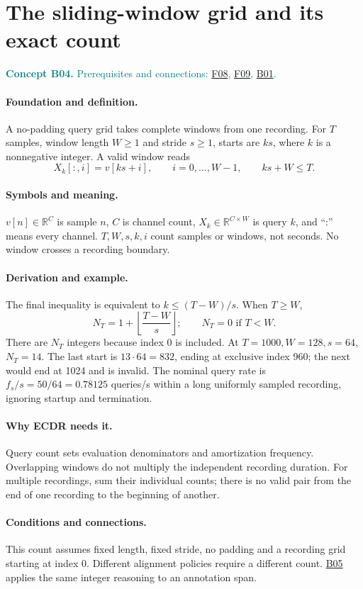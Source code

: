 \documentclass[11pt,a4paper]{article}
\newcommand{\R}{\mathbb R}
\newcommand{\conceptid}{Front matter}
\newcommand{\concept}[3]{\clearpage\renewcommand{\conceptid}{#1}%
\section{#2}\label{concept:#1}%
\textcolor{teal}{\textbf{Concept #1.} Prerequisites and connections: #3.}\par
\typeout{ECDR-CONCEPT-START #1 PAGE=\thepage}}
\begin{document}
\concept{B04}{The sliding-window grid and its exact count}{\hyperref[concept:F08]{F08}, \hyperref[concept:F09]{F09}, \hyperref[concept:B01]{B01}}
\paragraph{Foundation and definition.}
A no-padding query grid takes complete windows from one recording. For
$T$ samples, window length $W\ge1$ and stride $s\ge1$, starts are $ks$,
where $k$ is a nonnegative integer. A valid window reads
\[
 X_k[:,i]=v[ks+i],\qquad i=0,\ldots,W-1,
 \qquad ks+W\le T.
\]
\paragraph{Symbols and meaning.}
$v[n]\in\R^C$ is sample $n$, $C$ is channel count, $X_k\in\R^{C\times W}$
is query $k$, and ``:'' means every channel. $T,W,s,k,i$ count samples
or windows, not seconds. No window crosses a recording boundary.
\paragraph{Derivation and example.}
The final inequality is equivalent to $k\le(T-W)/s$. When $T\ge W$,
\[
 N_T=1+\left\lfloor\frac{T-W}{s}\right\rfloor;
 \qquad N_T=0\text{ if }T<W.
\]
There are $N_T$ integers because index 0 is included. At
$T=1000,W=128,s=64$, $N_T=14$. The last start is $13\cdot64=832$,
ending at exclusive index 960; the next would end at 1024 and is invalid.
The nominal query rate is $f_s/s=50/64=0.78125$ queries/s within a long
uniformly sampled recording, ignoring startup and termination.
\paragraph{Why ECDR needs it.}
Query count sets evaluation denominators and amortization frequency.
Overlapping windows do not multiply the independent recording duration.
For multiple recordings, sum their individual counts; there is no valid
pair from the end of one recording to the beginning of another.
\paragraph{Conditions and connections.}
This count assumes fixed length, fixed stride, no padding and a recording
grid starting at index 0. Different alignment policies require a different
count. \hyperref[concept:B05]{B05} applies the same integer reasoning to an annotation span.
\par\label{endconcept:B04}
\end{document}
